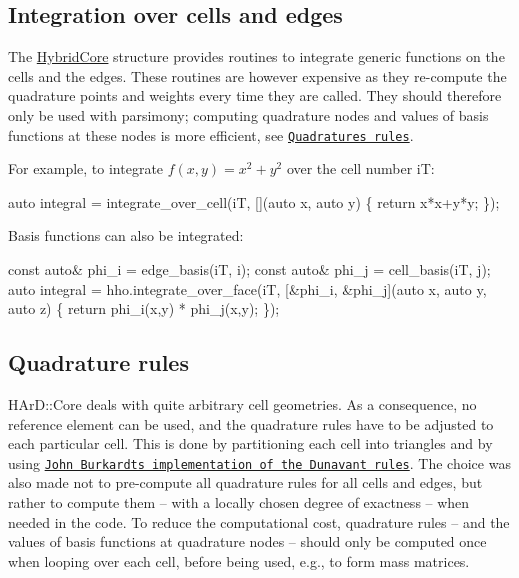\hypertarget{index_integrate_mesh}{}\subsection{Integration over cells and edges}\label{index_integrate_mesh}
The \hyperlink{classHArDCore2D_1_1HybridCore}{Hybrid\+Core} structure provides routines to integrate generic functions on the cells and the edges. These routines are however expensive as they re-\/compute the quadrature points and weights every time they are called. They should therefore only be used with parsimony; computing quadrature nodes and values of basis functions at these nodes is more efficient, see \href{#quad_rules}{\tt Quadratures rules}.

For example, to integrate $f(x,y) = x^2 + y^2 $ over the cell number iT\+:


\begin{DoxyCode}
\textcolor{keyword}{auto} integral = integrate\_over\_cell(iT, [](\textcolor{keyword}{auto} x, \textcolor{keyword}{auto} y) \{
        \textcolor{keywordflow}{return} x*x+y*y;
      \});
\end{DoxyCode}


Basis functions can also be integrated\+:


\begin{DoxyCode}
\textcolor{keyword}{const} \textcolor{keyword}{auto}& phi\_i = edge\_basis(iT, i);
\textcolor{keyword}{const} \textcolor{keyword}{auto}& phi\_j = cell\_basis(iT, j);
\textcolor{keyword}{auto} integral = hho.integrate\_over\_face(iT, [&phi\_i, &phi\_j](\textcolor{keyword}{auto} x, \textcolor{keyword}{auto} y, \textcolor{keyword}{auto} z) \{
  \textcolor{keywordflow}{return} phi\_i(x,y) * phi\_j(x,y);
\});
\end{DoxyCode}
\hypertarget{index_quad_rules}{}\subsection{Quadrature rules}\label{index_quad_rules}
H\+Ar\+D\+::\+Core deals with quite arbitrary cell geometries. As a consequence, no reference element can be used, and the quadrature rules have to be adjusted to each particular cell. This is done by partitioning each cell into triangles and by using \href{https://people.sc.fsu.edu/~jburkardt/cpp_src/triangle_dunavant_rule/triangle_dunavant_rule.html}{\tt John Burkardt\textquotesingle{}s implementation of the Dunavant rules}. The choice was also made not to pre-\/compute all quadrature rules for all cells and edges, but rather to compute them -- with a locally chosen degree of exactness -- when needed in the code. To reduce the computational cost, quadrature rules -- and the values of basis functions at quadrature nodes -- should only be computed once when looping over each cell, before being used, e.\+g., to form mass matrices.


